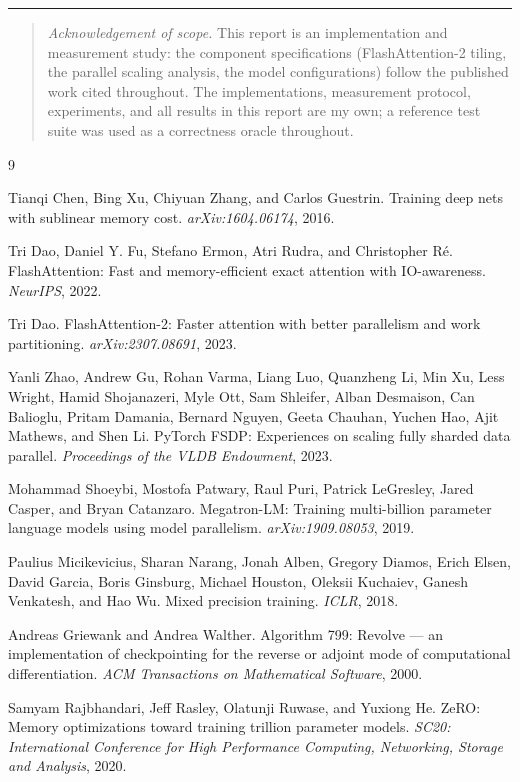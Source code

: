 \documentclass{article}
\begin{document}
\vspace{0.8em}
\noindent\rule{\linewidth}{0.4pt}
\vspace{-0.4em}
\begin{quote}
\small \emph{Acknowledgement of scope.} This report is an implementation and measurement study: the component specifications (FlashAttention-2 tiling, the parallel scaling analysis, the model configurations) follow the published work cited throughout. The implementations, measurement protocol, experiments, and all results in this report are my own; a reference test suite was used as a correctness oracle throughout.
\end{quote}

\begin{thebibliography}{9}

Tianqi Chen, Bing Xu, Chiyuan Zhang, and Carlos Guestrin.
\newblock Training deep nets with sublinear memory cost.
\newblock \emph{arXiv:1604.06174}, 2016.

Tri Dao, Daniel Y. Fu, Stefano Ermon, Atri Rudra, and Christopher R\'e.
\newblock FlashAttention: Fast and memory-efficient exact attention with IO-awareness.
\newblock \emph{NeurIPS}, 2022.

Tri Dao.
\newblock FlashAttention-2: Faster attention with better parallelism and work partitioning.
\newblock \emph{arXiv:2307.08691}, 2023.

Yanli Zhao, Andrew Gu, Rohan Varma, Liang Luo, Quanzheng Li, Min Xu, Less Wright, Hamid Shojanazeri, Myle Ott, Sam Shleifer, Alban Desmaison, Can Balioglu, Pritam Damania, Bernard Nguyen, Geeta Chauhan, Yuchen Hao, Ajit Mathews, and Shen Li.
\newblock PyTorch FSDP: Experiences on scaling fully sharded data parallel.
\newblock \emph{Proceedings of the VLDB Endowment}, 2023.

Mohammad Shoeybi, Mostofa Patwary, Raul Puri, Patrick LeGresley, Jared Casper, and Bryan Catanzaro.
\newblock Megatron-LM: Training multi-billion parameter language models using model parallelism.
\newblock \emph{arXiv:1909.08053}, 2019.

Paulius Micikevicius, Sharan Narang, Jonah Alben, Gregory Diamos, Erich Elsen, David Garcia, Boris Ginsburg, Michael Houston, Oleksii Kuchaiev, Ganesh Venkatesh, and Hao Wu.
\newblock Mixed precision training.
\newblock \emph{ICLR}, 2018.

Andreas Griewank and Andrea Walther.
\newblock Algorithm 799: Revolve --- an implementation of checkpointing for the reverse or adjoint mode of computational differentiation.
\newblock \emph{ACM Transactions on Mathematical Software}, 2000.

Samyam Rajbhandari, Jeff Rasley, Olatunji Ruwase, and Yuxiong He.
\newblock ZeRO: Memory optimizations toward training trillion parameter models.
\newblock \emph{SC20: International Conference for High Performance Computing, Networking, Storage and Analysis}, 2020.

\end{thebibliography}
\end{document}
